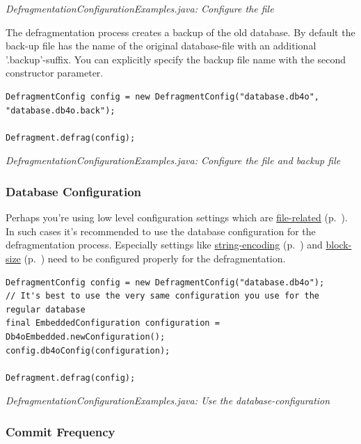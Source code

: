{\small\itshape DefragmentationConfigurationExamples.java: Configure the file\par}
\medskip

The defragmentation process creates a backup of the old database. By default the back-up file has the name of the original database-file with an additional '.backup'-suffix. You can explicitly specify the backup file name with the second constructor parameter.

\begin{lstlisting}
DefragmentConfig config = new DefragmentConfig("database.db4o", "database.db4o.back");

Defragment.defrag(config);
\end{lstlisting}

{\small\itshape DefragmentationConfigurationExamples.java: Configure the file and backup file\par}
\medskip

\subsubsection{Database Configuration}
\label{ref:advanced-topics-defragment-configuration-database-configuration}

Perhaps you're using low level configuration settings which are \hyperref[ref:configuration-file-configuration]{file-related} (p.~\pageref{ref:configuration-file-configuration}). In such cases it's recommended to use the database configuration for the defragmentation process. Especially settings like \hyperref[ref:configuration-common-string-encoding]{string-encoding} (p.~\pageref{ref:configuration-common-string-encoding}) and \hyperref[ref:configuration-file-block-size]{block-size} (p.~\pageref{ref:configuration-file-block-size}) need to be configured properly for the defragmentation.

\begin{lstlisting}
DefragmentConfig config = new DefragmentConfig("database.db4o");
// It's best to use the very same configuration you use for the regular database
final EmbeddedConfiguration configuration = Db4oEmbedded.newConfiguration();
config.db4oConfig(configuration);

Defragment.defrag(config);
\end{lstlisting}

{\small\itshape DefragmentationConfigurationExamples.java: Use the database-configuration\par}
\medskip

\subsubsection{Commit Frequency}
\label{ref:advanced-topics-defragment-configuration-commit-frequency}

